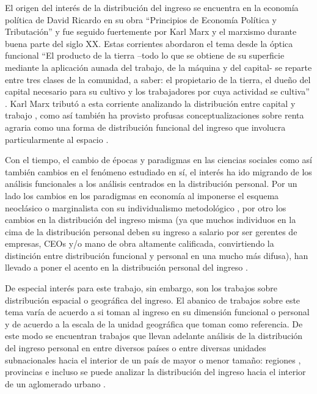 El origen del interés de la distribución del ingreso se encuentra en la economía política de David Ricardo \citeyear{ricardo} en su obra “Principios de Economía Política y Tributación” y fue seguido fuertemente por Karl Marx y el marxismo durante buena parte del siglo XX. Estas corrientes abordaron el tema desde la óptica funcional “El producto de la tierra –todo lo que se obtiene de su superficie mediante la aplicación aunada del trabajo, de la máquina y del capital- se reparte entre tres clases de la comunidad, a saber: el propietario de la tierra, el dueño del capital necesario para su cultivo y los trabajadores por cuya actividad se cultiva” \cite[p.~5]{ricardo}. Karl Marx tributó a esta corriente analizando la distribución entre capital y trabajo \cite{marx2004}, como así también ha provisto profusas conceptualizaciones sobre renta agraria como una forma de distribución funcional del ingreso que involucra particularmente al espacio \cite{marx2011}. 

Con el tiempo, el cambio de épocas y paradigmas en las ciencias sociales como así también cambios en el fenómeno estudiado en sí, el interés ha ido migrando de los análisis funcionales a los análisis centrados en la distribución personal. Por un lado los cambios en los paradigmas en economía al imponerse el esquema neoclásico o marginalista con su individualismo metodológico \cite{blaug}, por otro los cambios en la distribución del ingreso misma (ya que muchos individuos en la cima de la distribución personal deben su ingreso a salario por ser gerentes de empresas, CEOs y/o mano de obra altamente calificada, convirtiendo la distinción entre distribución funcional y personal en una mucho más difusa), han llevado a poner el acento en la distribución personal del ingreso \cite{altimir1986,gasparini2001}.

De especial interés para este trabajo, sin embargo, son los trabajos sobre distribución espacial o geográfica del ingreso. El abanico de trabajos sobre este tema varía de acuerdo a si toman al ingreso en su dimensión funcional o personal y de acuerdo a la escala de la unidad geográfica que toman como referencia. De este modo se encuentran trabajos que llevan adelante análisis de la distribución del ingreso personal en entre diversos países \cite{theil,milanovic2002,milanovic2005,davies} o entre diversas unidades subnacionales hacia el interior de un país de mayor o menor tamaño: regiones \cite{orsatti,artana}, provincias \cite{altimir1975} e incluso se puede analizar la distribución del ingreso hacia el interior de un aglomerado urbano \cite{gasparini2000,giayetto} . 

